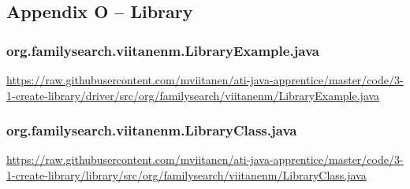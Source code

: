 \subsection*{Appendix O -- Library} \label{App:AppendixO}

\subsubsection*{org.familysearch.viitanenm.LibraryExample.java}
\noindent
\begin{minipage}{.6in}
\end{minipage}
\begin{minipage}{6in}
  \url{https://raw.githubusercontent.com/mviitanen/ati-java-apprentice/master/code/3-1-create-library/driver/src/org/familysearch/viitanenm/LibraryExample.java}
\end{minipage}

\vspace{1em}
\subsubsection*{org.familysearch.viitanenm.LibraryClass.java}
\noindent
\begin{minipage}{.6in}
\end{minipage}
\begin{minipage}{6in}
  \url{https://raw.githubusercontent.com/mviitanen/ati-java-apprentice/master/code/3-1-create-library/library/src/org/familysearch/viitanenm/LibraryClass.java}
\end{minipage}

